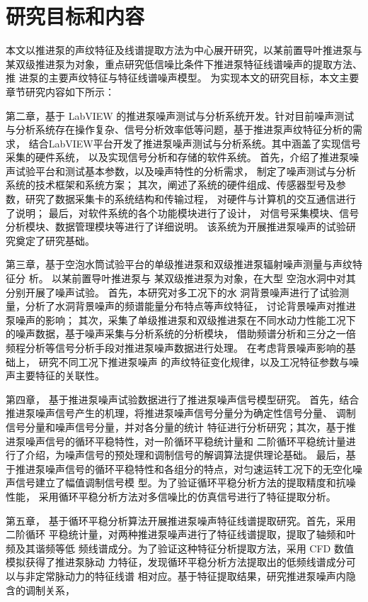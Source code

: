 \section{研究目标和内容}
本文以推进泵的声纹特征及线谱提取方法为中心展开研究，以某前置导叶推进泵与
某双级推进泵为对象，重点研究低信噪比条件下推进泵特征线谱噪声的提取方法、推
进泵的主要声纹特征与特征线谱噪声模型。
为实现本文的研究目标，本文主要章节研究内容如下所示：

第二章，基于 LabVIEW 的推进泵噪声测试与分析系统开发。针对目前噪声测试与分析系统存在操作复杂、信号分析效率低等问题，基于推进泵声纹特征分析的需求，
结合LabVIEW平台开发了推进泵噪声测试与分析系统。其中涵盖了实现信号采集的硬件系统，
以及实现信号分析和存储的软件系统。
首先，介绍了推进泵噪声试验平台和测试基本参数，以及噪声特性的分析需求，
制定了噪声测试与分析系统的技术框架和系统方案；
其次，阐述了系统的硬件组成、传感器型号及参数，研究了数据采集卡的系统结构和传输过程，
对硬件与计算机的交互通信进行了说明；
最后，对软件系统的各个功能模块进行了设计，
对信号采集模块、信号分析模块、数据管理模块等进行了详细说明。
该系统为开展推进泵噪声的试验研究奠定了研究基础。

第三章，基于空泡水筒试验平台的单级推进泵和双级推进泵辐射噪声测量与声纹特征分
析。
以某前置导叶推进泵与
某双级推进泵为对象，在大型
空泡水洞中对其分别开展了噪声试验。
首先，本研究对多工况下的水
洞背景噪声进行了试验测量，分析了水洞背景噪声的频谱能量分布特点等声纹特征，
讨论背景噪声对推进泵噪声的影响；
其次，采集了单级推进泵和双级推进泵在不同水动力性能工况下的噪声数据，基于噪声采集与分析系统的分析模块，
借助频谱分析和三分之一倍频程分析等信号分析手段对推进泵噪声数据进行处理。
在考虑背景噪声影响的基础上，
研究不同工况下推进泵噪声
的声纹特征变化规律，以及工况特征参数与噪声主要特征的关联性。

第四章，
基于推进泵噪声试验数据进行了推进泵噪声信号模型研究。
首先，结合推进泵噪声信号产生的机理，将推进泵噪声信号分量分为确定性信号分量、
调制信号分量和噪声信号分量，并对各分量的统计
特征进行分析研究；其次，基于推进泵噪声信号的循环平稳特性，对一阶循环平稳统计量和
二阶循环平稳统计量进行了介绍，为噪声信号的预处理和调制信号的解调算法提供理论基础。
最后，基于推进泵噪声信号的循环平稳特性和各组分的特点，对匀速运转工况下的无空化噪声信号建立了幅值调制信号模
型。为了验证循环平稳分析方法的提取精度和抗噪性能，
采用循环平稳分析方法对多信噪比的仿真信号进行了特征提取分析。

第五章，
基于循环平稳分析算法开展推进泵噪声特征线谱提取研究。首先，采用二阶循环
平稳统计量，对两种推进泵噪声进行了特征线谱提取，提取了轴频和叶频及其谐频等低
频线谱成分。为了验证这种特征分析提取方法，采用 CFD 数值模拟获得了推进泵脉动
力特征，发现循环平稳分析方法提取出的低频线谱成分可以与非定常脉动力的特征线谱
相对应。基于特征提取结果，研究推进泵噪声内隐含的调制关系，
